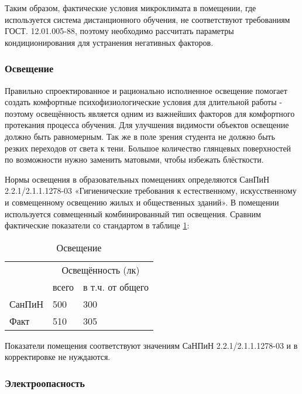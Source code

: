 Таким образом, фактические условия микроклимата в помещении, где используется система дистанционного обучения, не соответствуют требова\-ниям ГОСТ. 12.01.005-88, поэтому необходимо рассчитать параметры кондици\-онирования для устранения негативных факторов.

\subsubsection{Освещение}

Правильно спроектированное и рационально исполненное освещение помо\-гает создать комфортные психофизиологические условия для длительной работы - поэтому освещён\-ность является одним из важнейших факторов для комфортного протекания про\-цесса обучения. Для улучшения видимости объектов освещение должно быть рав\-номерным. Так же в поле зрения сту\-дента не должно быть резких переходов от света к тени. Большое количество глянце\-вых поверхностей по возможности нужно заменить матовыми, чтобы избежать блёсткости.

Нормы освещения в образовательных помещениях определяются СанПиН\\ 2.2.1/2.1.1.1278-03 «Гигиенические требования к естественному, искусствен\-ному и сов\-мещенному освещению жилых и общественных зданий». В по\-мещении используется совме\-щенный комбинированный тип освещения. Срав\-ним фактические показатели со стан\-дартом в таблице \ref{lightparams}:

\begin{table}[H]
\caption{Освещение\label{lightparams}}
\begin{center}
\begin{tabular}{|p{3cm}|p{3cm}|p{3cm}|}
\hline
& \multicolumn{2}{|c|}{Освещённость (лк)}  \\
\cline{2-3}
& всего & в т.ч. от общего \\
\hline
СанПиН & 500 & 300\\
\hline
Факт & 510 & 305\\
\hline
\end{tabular}
\end{center}
\end{table}

Показатели помещения соответствуют значениям СаНПиН 2.2.1/2.1.1.1278-03 и в корректировке не нуждаются.

\subsubsection{Электроопасность}

